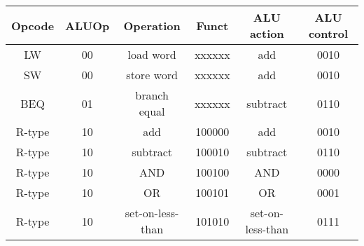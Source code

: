 \begin{tabular}[t]{cccccc}
    \toprule
    Opcode & ALUOp       & Operation        & Funct           & ALU action       & ALU control   \\
    \midrule
    LW     & {00} & load word        & {xxxxxx} & add              & {0010} \\
    SW     & {00} & store word       & {xxxxxx} & add              & {0010} \\
    BEQ    & {01} & branch equal     & {xxxxxx} & subtract         & {0110} \\
    R-type & {10} & add              & {100000} & add              & {0010} \\
    R-type & {10} & subtract         & {100010} & subtract         & {0110} \\
    R-type & {10} & AND              & {100100} & AND              & {0000} \\
    R-type & {10} & OR               & {100101} & OR               & {0001} \\
    R-type & {10} & set-on-less-than & {101010} & set-on-less-than & {0111} \\
    \bottomrule
\end{tabular}
